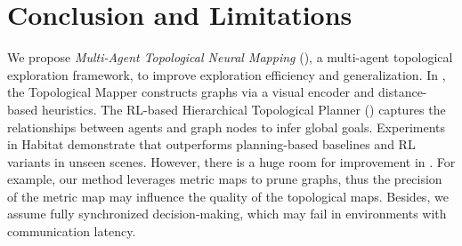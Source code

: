 
\section{Conclusion and Limitations}
We propose \emph{Multi-Agent Topological Neural Mapping} (\name), a multi-agent topological exploration framework, to improve exploration efficiency and generalization. In {\name}, the Topological Mapper constructs graphs via a visual encoder and distance-based heuristics. The RL-based Hierarchical Topological Planner (\planner) captures the relationships between agents and graph nodes to infer global goals. Experiments in Habitat demonstrate that {\name} outperforms planning-based baselines and RL variants in unseen scenes. However, there is a huge room for improvement in {\name}. For example, our method leverages metric maps to prune graphs, thus the precision of the metric map may influence the quality of the topological maps. Besides, we assume fully synchronized decision-making, which may fail in environments with communication latency. 

